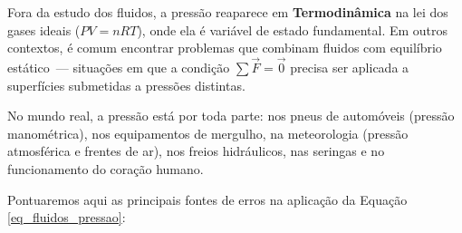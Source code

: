 
Fora da estudo dos fluidos, a pressão reaparece em \textbf{Termodinâmica} na lei dos gases ideais ($PV = nRT$), onde ela
é variável de estado fundamental. Em outros contextos, é comum encontrar problemas que combinam fluidos com equilíbrio estático~--- situações em que a condição $\sum \vec{F} = \vec{0}$ precisa ser aplicada a superfícies submetidas a pressões distintas.
 
No mundo real, a pressão está por toda parte: nos pneus de automóveis (pressão manométrica), nos equipamentos de mergulho, na meteorologia (pressão atmosférica e frentes de ar), nos freios hidráulicos, nas seringas e no funcionamento do coração humano.





Pontuaremos aqui as principais fontes de erros na aplicação da Equação \eqref{eq_fluidos_pressao}:

